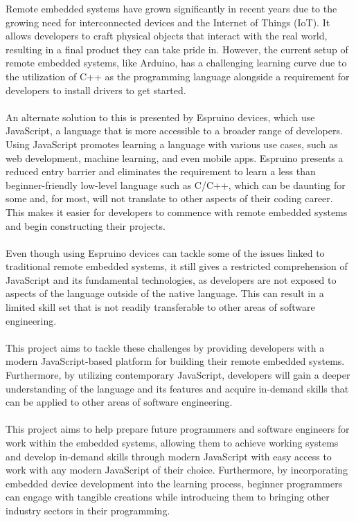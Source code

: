 \documentclass{l4proj}
\begin{document}
\text 
Remote embedded systems have grown significantly in recent years due to the growing need for interconnected devices and the Internet of Things (IoT). It allows developers to craft physical objects that interact with the real world, resulting in a final product they can take pride in. However, the current setup of remote embedded systems, like Arduino, has a challenging learning curve due to the utilization of C++ as the programming language alongside a requirement for developers to install drivers to get started.
\\ \\
An alternate solution to this is presented by Espruino devices, which use JavaScript, a language that is more accessible to a broader range of developers. Using JavaScript promotes learning a language with various use cases, such as web development, machine learning, and even mobile apps. Espruino presents a reduced entry barrier and eliminates the requirement to learn a less than beginner-friendly low-level language such as C/C++, which can be daunting for some and, for most, will not translate to other aspects of their coding career. This makes it easier for developers to commence with remote embedded systems and begin constructing their projects.
\\ \\
Even though using Espruino devices can tackle some of the issues linked to traditional remote embedded systems, it still gives a restricted comprehension of JavaScript and its fundamental technologies, as developers are not exposed to aspects of the language outside of the native language. This can result in a limited skill set that is not readily transferable to other areas of software engineering.
\\ \\
This project aims to tackle these challenges by providing developers with a modern JavaScript-based platform for building their remote embedded systems. Furthermore, by utilizing contemporary JavaScript, developers will gain a deeper understanding of the language and its features and acquire in-demand skills that can be applied to other areas of software engineering.
\\ \\
This project aims to help prepare future programmers and software engineers for work within the embedded systems, allowing them to achieve working systems and develop in-demand skills through modern JavaScript with easy access to work with any modern JavaScript of their choice. Furthermore, by incorporating embedded device development into the learning process, beginner programmers can engage with tangible creations while introducing them to bringing other industry sectors in their programming.
\end{document}
